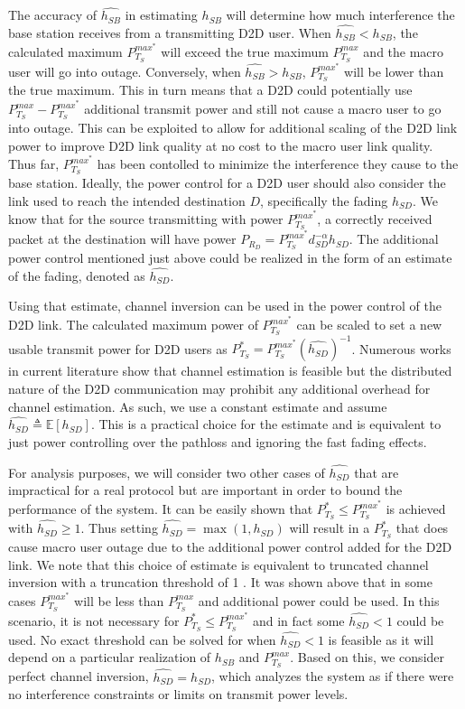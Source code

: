 \documentclass[10pt, final, journal, letterpaper,oneside, twocolumn]{IEEEtran}
\begin{document}
The accuracy of $\widehat{h_{SB}}$ in estimating $h_{SB}$ will determine how much interference the base station receives from a transmitting D2D user.  When $\widehat{h_{SB}} < h_{SB}$, the calculated maximum $P_{T_{S}}^{max^*}$ will exceed the true maximum $P_{T_{S}}^{max}$ and the macro user will go into outage.  Conversely, when $\widehat{h_{SB}} > h_{SB}$, $P_{T_{S}}^{max^*}$ will be lower than the true maximum.  This in turn means that a D2D could potentially use $P_{T_{S}}^{max} - P_{T_{S}}^{max^*}$ additional transmit power and still not cause a macro user to go into outage.  This can be exploited to allow for additional scaling of the D2D link power to improve D2D link quality at no cost to the macro user link quality.  Thus far, $P_{T_{S}}^{max^*}$ has been contolled to minimize the interference they cause to the base station.  Ideally, the power control for a D2D user should also consider the link used to reach the intended destination $D$, specifically the fading $h_{SD}$.  We know that for the source transmitting with power $P_{T_{S}}^{max^*}$, a correctly received packet at the destination will have power $P_{R_{D}}=P_{T_{S}}^{max^*} d_{SD}^{-\alpha} h_{SD}$.  The additional power control mentioned just above could be realized in the form of an estimate of the fading, denoted as $\widehat{h_{SD}}$.  

Using that estimate, channel inversion can be used in the power control of the D2D link.  The calculated maximum power of $P_{T_{S}}^{max^*}$ can be scaled to set a new usable transmit power for D2D users as $P_{T_{S}}^{*} = P_{T_{S}}^{max^*} (\widehat{h_{SD}})^{-1}$.  Numerous works in current literature show that channel estimation is feasible but the distributed nature of the D2D communication may prohibit any additional overhead for channel estimation.  As such, we use a constant estimate and assume $\widehat{h_{SD}} \triangleq \mathbb{E}[h_{SD}]$.  This is a practical choice for the estimate and is equivalent to just power controlling over the pathloss and ignoring the fast fading effects.  

For analysis purposes, we will consider two other cases of $\widehat{h_{SD}}$  that are impractical for a real protocol but are important  in order to bound the performance of the system.  It can be easily shown that $P_{T_{S}}^{*} \leq P_{T_{S}}^{max^*}$ is achieved with $\widehat{h_{SD}} \geq 1$.  Thus setting $\widehat{h_{SD}} = \max(1, h_{SD})$ will result in a $P_{T_{S}}^{*}$ that does cause macro user outage due to the additional power control added for the D2D link.  We note that this choice of estimate is equivalent to truncated channel inversion with a truncation threshold of 1 \cite{goldsmith_book}.  It was shown above that in some cases $P_{T_{S}}^{max^*}$ will be less than $P_{T_{S}}^{max}$ and additional power could be used.  In this scenario, it is not necessary for $P_{T_{S}}^{*} \leq P_{T_{S}}^{max^*}$ and in fact some $\widehat{h_{SD}} < 1$ could be used.  No exact threshold can be solved for when $\widehat{h_{SD}} < 1$ is feasible as it will depend on a particular realization of $h_{SB}$ and  $P_{T_{S}}^{max}$. Based on this, we consider perfect channel inversion, $\widehat{h_{SD}} = h_{SD}$, which analyzes the system as if there were no interference constraints or limits on transmit power levels. 
\end{document}
